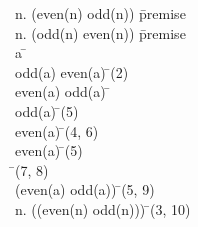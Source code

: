 \documentclass{article}
\begin{document}
\begin{proofbox}
\: \forall n. (\lnot even(n) \rightarrow odd(n)) \= \hbox{premise} \\
\: \forall n. (odd(n) \rightarrow \lnot even(n)) \= \hbox{premise} \\
\open
\: a \= \forallintroconst \\
\: odd(a) \rightarrow \lnot even(a) \= \forallelim(2) \\
\open
\: even(a) \land odd(a) \= \asm \\
\: odd(a) \= \andelim(5) \\
\: \lnot even(a) \= \implieselim(4, 6) \\
\: even(a) \= \andelim(5) \\
\: \bot \= \notelim(7, 8) \\
\close
\: \lnot (even(a) \land odd(a)) \= \notintro(5, 9) \\
\close
\: \forall n. (\lnot (even(n) \land odd(n))) \= \forallintro(3, 10) \\
\end{proofbox}
\end{document}
